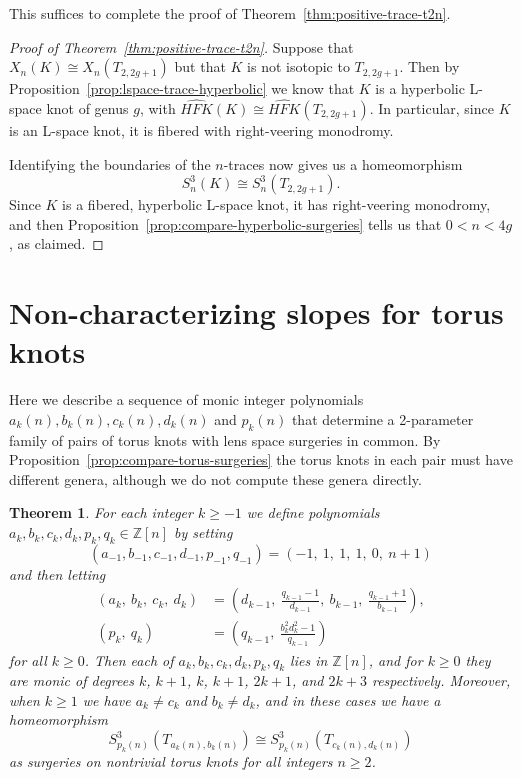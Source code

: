 \documentclass[11pt]{amsart}
\newtheorem {theorem}{Theorem}
\numberwithin{equation}{section}
\numberwithin{theorem}{section}
\theoremstyle{definition}
\newcommand{\Z}{\mathbb{Z}}
\newcommand\hfk{\mathit{HFK}}
\newcommand\hfkhat{\widehat{\hfk}}
\begin{document}
This suffices to complete the proof of Theorem~\ref{thm:positive-trace-t2n}.

\begin{proof}[Proof of Theorem~\ref{thm:positive-trace-t2n}]
Suppose that $X_n(K) \cong X_n(T_{2,2g+1})$ but that $K$ is not isotopic to $T_{2,2g+1}$.  Then by Proposition~\ref{prop:lspace-trace-hyperbolic} we know that $K$ is a hyperbolic L-space knot of genus $g$, with $\hfkhat(K) \cong \hfkhat(T_{2,2g+1})$.  In particular, since $K$ is an L-space knot, it is fibered with right-veering monodromy.

Identifying the boundaries of the $n$-traces now gives us a homeomorphism
\[ S^3_n(K) \cong S^3_n(T_{2,2g+1}). \]
Since $K$ is a fibered, hyperbolic L-space knot, it has right-veering monodromy, and then Proposition~\ref{prop:compare-hyperbolic-surgeries} tells us that $0 < n < 4g$, as claimed.
\end{proof}

%
%
%
%
%

\appendix

\section{Non-characterizing slopes for torus knots} \label{sec:torus-pairs}

Here we describe a sequence of monic integer polynomials $a_k(n), b_k(n), c_k(n), d_k(n)$ and $p_k(n)$ that determine a 2-parameter family of pairs of torus knots with lens space surgeries in common.  By Proposition~\ref{prop:compare-torus-surgeries} the torus knots in each pair must have different genera, although we do not compute these genera directly.

\begin{theorem} \label{thm:torus-pairs}
For each integer $k \geq -1$ we define polynomials $a_k, b_k, c_k, d_k, p_k, q_k \in \Z[n]$ by setting 
\[ (a _{-1},b _{-1},c _{-1},d _{-1},p _{-1},q _{-1}) = (-1,\ 1,\ 1,\ 1,\ 0,\ n+1) \]
and then letting
\begin{align*}
(a _k,\ b _k,\ c _k,\ d _k) &= \left( d _{k-1},\ \frac{q _{k-1}-1}{d _{k-1}},\ b _{k-1},\ \frac{q _{k-1}+1}{b _{k-1}} \right), \\
(p _k,\ q _k) &= \left(q _{k-1},\ \frac{b _k^2 d _k^2 - 1}{q _{k-1}}\right)
\end{align*}
for all $k \geq 0$.  Then each of $a_k,b_k,c_k,d_k,p_k,q_k$ lies in $\Z[n]$, and for $k\geq 0$ they are monic of degrees $k$, $k+1$, $k$, $k+1$, $2k+1$, and $2k+3$ respectively.  Moreover, when $k\geq 1$ we have $a_k \neq c_k$ and $b_k \neq d_k$, and in these cases we have a homeomorphism
\[ S^3_{p_k(n)}(T_{a_k(n),b_k(n)}) \cong S^3_{p_k(n)}(T_{c_k(n),d_k(n)}) \]
as surgeries on nontrivial torus knots for all integers $n \geq 2$.
\end{theorem}
\end{document}
